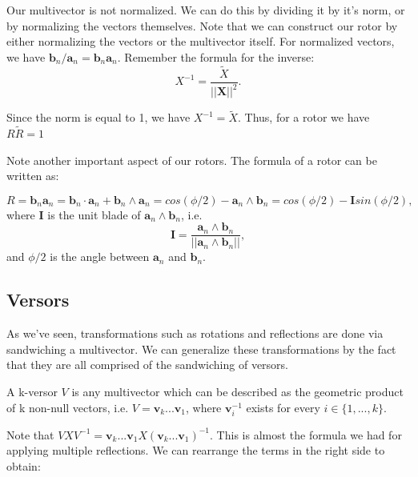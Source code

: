Our multivector is not normalized. We can do this by dividing it by it's norm, or by normalizing the
vectors themselves.
Note that we can construct our rotor by either normalizing the vectors
or the multivector itself.
For normalized vectors, we have $\mathbf b_n /\mathbf a_n = \mathbf b_n \mathbf a_n$.
Remember the formula for the inverse:
\begin{displaymath}
    X^{-1} = \frac{\tilde{X}}{||\mathbf X ||^2}.
\end{displaymath}

Since the norm is equal to 1, we have $X^{-1}= \tilde{X}$.
Thus, for a rotor we have $R \tilde{R} = 1$


Note another important aspect of our rotors. The formula of a rotor can be written as:

\begin{displaymath}
    R = \mathbf b_n \mathbf a_n = \mathbf b_n \cdot \mathbf a_n + \mathbf b_n \wedge \mathbf a_n =
    cos(\phi/2) - \mathbf a_n \wedge \mathbf b_n = 
    cos(\phi/2) - \mathbf I sin(\phi/2),
\end{displaymath}
where
$\mathbf I$ is the unit blade of $\mathbf a_n \wedge \mathbf b_n$, i.e.
\begin{displaymath}
    \mathbf I = \frac{\mathbf a_n \wedge \mathbf b_n}{||\mathbf a_n \wedge \mathbf b_n||},
\end{displaymath}
and $\phi/2$ is the angle between $\mathbf a_n$ and $\mathbf b_n$.

\subsection{Versors}

As we've seen, transformations such as rotations and reflections are done via sandwiching a multivector.
We can generalize these transformations by the fact that they are all comprised of the sandwiching of versors.

\begin{definition}[Versor]
    A k-versor $V$ is any multivector which can be described as the geometric
    product of k non-null vectors, i.e. $V = \mathbf v_k ... \mathbf v_1$, where $\mathbf v_i^{-1}$
    exists for every $i \in \{1,...,k\}$.
\end{definition}

Note that $V X V^{-1} = \mathbf v_k...\mathbf v_1 X (\mathbf v_k...\mathbf v_1)^{-1}$. This is almost the formula
we had for applying multiple reflections. We can rearrange the terms in the right side to obtain:

